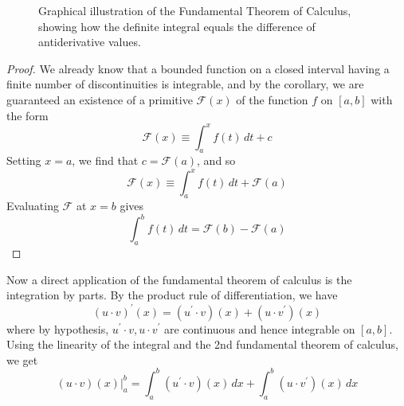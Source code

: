 \begin{theorem}
\begin{figure}[H]
      \caption{Graphical illustration of the Fundamental Theorem of Calculus, showing how the definite integral equals the difference of antiderivative values.} 
      \label{fig:ftc2-illustration}
    \end{figure}
  \end{theorem}
  \begin{proof}
    We already know that a bounded function on a closed interval having a finite number of discontinuities is integrable, and by the corollary, we are guaranteed an existence of a primitive $\mathcal{F}(x)$ of the function $f$ on $[a, b]$ with the form 
    \begin{equation}
      \mathcal{F} (x) \equiv \int_a^x f(t)\,dt + c
    \end{equation}
    Setting $x = a$, we find that $c = \mathcal{F}(a)$, and so 
    \begin{equation}
      \mathcal{F}(x) \equiv \int_a^x f(t)\,dt + \mathcal{F}(a)
    \end{equation}
    Evaluating $\mathcal{F}$ at $x = b$ gives
    \begin{equation}
      \int_a^b f(t)\,dt = \mathcal{F}(b) - \mathcal{F}(a)
    \end{equation}
  \end{proof}

  Now a direct application of the fundamental theorem of calculus is the integration by parts. By the product rule of differentiation, we have
  \begin{equation}
    (u \cdot v)^\prime (x) = (u^\prime \cdot v)(x) + (u \cdot v^\prime) (x)
  \end{equation}
  where by hypothesis, $u^\prime \cdot v, u \cdot v^\prime$ are continuous and hence integrable on $[a, b]$. Using the linearity of the integral and the 2nd fundamental theorem of calculus, we get
  \begin{equation}
    (u \cdot v) (x) \big|^b_a = \int_a^b (u^\prime \cdot v)(x)\,dx + \int_a^b (u \cdot v^\prime) (x)\,dx
  \end{equation}

